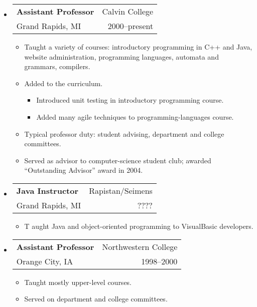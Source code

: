 \documentclass[letterpaper,10pt]{article}
\makeatletter
\newcommand{\resitem}[1]{\item #1 \vspace{-2pt}}
\newcommand{\ressubheading}[4]{ 
\begin{tabular*}{7in}{l@{\extracolsep{\fill}}r}
	\textbf{#1} & #2 \\
	{#3} & {#4} \\
\end{tabular*}
\vspace{-6pt}}
\makeatother
\begin{document}
\begin{itemize}
	\item \ressubheading{Assistant Professor}{Calvin College}{Grand Rapids, MI}{2000--present} 
	  \begin{itemize}
		\resitem{Taught a variety of courses: introductory programming in C++ and Java, website administration, programming languages, automata and grammars, compilers.}
		\resitem{Added to the curriculum.}
		\begin{itemize}
			\item Introduced unit testing in introductory programming course.
			\item Added many agile techniques to programming-languages course.
		\end{itemize}
		\resitem{Typical professor duty: student advising, department and college committees.}
		\resitem{Served as advisor to computer-science student club; awarded ``Outstanding Advisor'' award in 2004.}
	\end{itemize}
	
	\item \ressubheading{Java Instructor}{Rapistan/Seimens}{Grand Rapids, MI}{????}
	\begin{itemize}
		\resitem Taught Java and object-oriented programming to VisualBasic developers.
	\end{itemize}
	
	\item \ressubheading{Assistant Professor}{Northwestern College}{Orange City, IA}{1998--2000} 
	\begin{itemize}
		\resitem{Taught mostly upper-level courses.}
		\resitem{Served on department and college committees.}
	\end{itemize}
	

\end{itemize}
\end{document}
